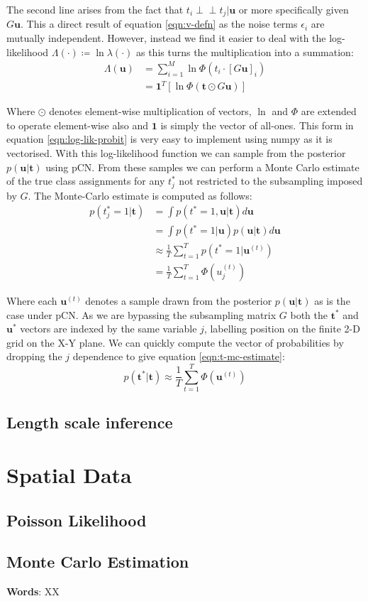 \documentclass[]{article}
\newcommand{\lik}{\lambda}
\newcommand{\loglik}{\Lambda}
\newcommand{\indep}{\perp \!\!\! \perp}
\newcommand{\tbold}{\boldsymbol{t}}
\newcommand{\ubold}{\boldsymbol{u}}
\begin{document}
The second line arises from the fact that $t_i \indep t_j | \ubold$ or more specifically given $G\ubold$. This a direct result of equation \ref{eqn:v-defn} as the noise terms $\epsilon_i$ are mutually independent. However, instead we find it easier to deal with the log-likelihood $\loglik(\cdot) \coloneqq \ln \lik(\cdot)$ as this turns the multiplication into a summation:
%
\begin{align}
	\loglik(\ubold) &= \sum_{i=1}^{M} \ln \Phi(t_i \cdot [G\ubold]_i) \nonumber \\
	&= \mathbf{1}^T \left[ \ln \Phi(\tbold \odot G\ubold) \right]
	\label{eqn:log-lik-probit}
\end{align}

Where $\odot$ denotes element-wise multiplication of vectors, $\ln$ and $\Phi$ are extended to operate element-wise also and $\mathbf{1}$ is simply the vector of all-ones. This form in equation \ref{eqn:log-lik-probit} is very easy to implement using numpy as it is vectorised. With this log-likelihood function we can sample from the posterior $p(\ubold | \tbold)$ using pCN. From these samples we can perform a Monte Carlo estimate of the true class assignments for any $t^*_j$ not restricted to the subsampling imposed by $G$. The Monte-Carlo estimate is computed as follows:
%
\begin{align}
	p(t^*_j = 1 | \tbold) &= \int p(t^* = 1, \ubold | \tbold) d\ubold \nonumber \\
	&= \int p(t^* = 1 | \ubold) p(\ubold | \tbold) d\ubold \nonumber \\
	&\approx \frac{1}{T} \sum_{t=1}^{T} p \left( t^* = 1 | \ubold^{(t)} \right) \nonumber \\
	&= \frac{1}{T} \sum_{t=1}^{T} \Phi \left( u^{(t)}_j \right)
\end{align}

Where each $\ubold^{(t)}$ denotes a sample drawn from the posterior $p(\ubold | \tbold)$ as is the case under pCN. As we are bypassing the subsampling matrix $G$ both the $\tbold^*$ and $\ubold^*$ vectors are indexed by the same variable $j$, labelling position on the finite 2-D grid on the X-Y plane. We can quickly compute the vector of probabilities by dropping the $j$ dependence to give equation \ref{eqn:t-mc-estimate}:
%
\begin{equation}
	p(\tbold^* | \tbold) \approx \frac{1}{T} \sum_{t=1}^{T} \Phi \left( \ubold^{(t)} \right)
	\label{eqn:t-mc-estimate}
\end{equation}
\subsection{Length scale inference}

\section{Spatial Data}

\subsection{Poisson Likelihood}

\subsection{Monte Carlo Estimation}

\textbf{Words}: XX
\end{document}
